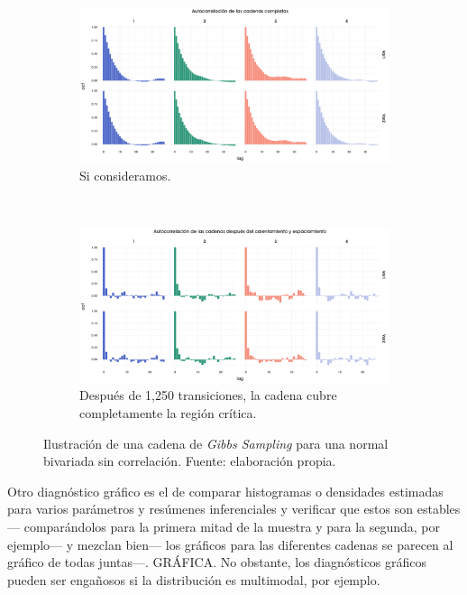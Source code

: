 \begin{figure}[h]
    \centering
    \begin{subfigure}{0.7\textwidth}
        \includegraphics[width=\textwidth]{Figs/Bayes/Ejemplos_Convergencia_Autocorr_Completas}
        \caption{Si consideramos.}
    \end{subfigure}
    ~ 
    \begin{subfigure}{0.7\textwidth}
        \includegraphics[width=\textwidth]{Figs/Bayes/Ejemplos_Convergencia_Autocorr_Final}
        \caption{Después de 1,250 transiciones, la cadena cubre completamente la región crítica.}
    \end{subfigure}
    \caption{Ilustración de una cadena de \textit{Gibbs Sampling} para una normal bivariada sin correlación. Fuente: elaboración propia.}\label{fig:Conv_Autocorr}
\end{figure}

Otro diagnóstico gráfico es el de comparar histogramas o densidades estimadas para varios parámetros y resúmenes inferenciales y verificar que estos son estables--- comparándolos para la primera mitad de la muestra y para la segunda, por ejemplo--- y mezclan bien--- los gráficos para las diferentes cadenas se parecen al gráfico de todas juntas---. {\color{red} GRÁFICA}. No obstante, los diagnósticos gráficos pueden ser engañosos si la distribución es multimodal, por ejemplo.\\

